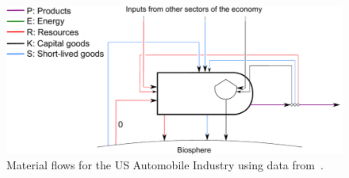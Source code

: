 
\begin{figure}[!ht]
\centering
\includegraphics[width=0.8\linewidth]{Part_1/Chapter_Materials/images/PERKS_basic_unit_materials_auto_ind.pdf}
\caption[Material flows for the US Automobile Industry]{Material 
flows for the US Automobile Industry using data from~\cite{Sullivan1998, 
MacLean1998,Schweimer2000, McCleese2002,MacLean2003, Burnham2006,
Sullivan2010, Hawkins2012}.}
\label{fig:PERKS_materials_auto}
\end{figure}

